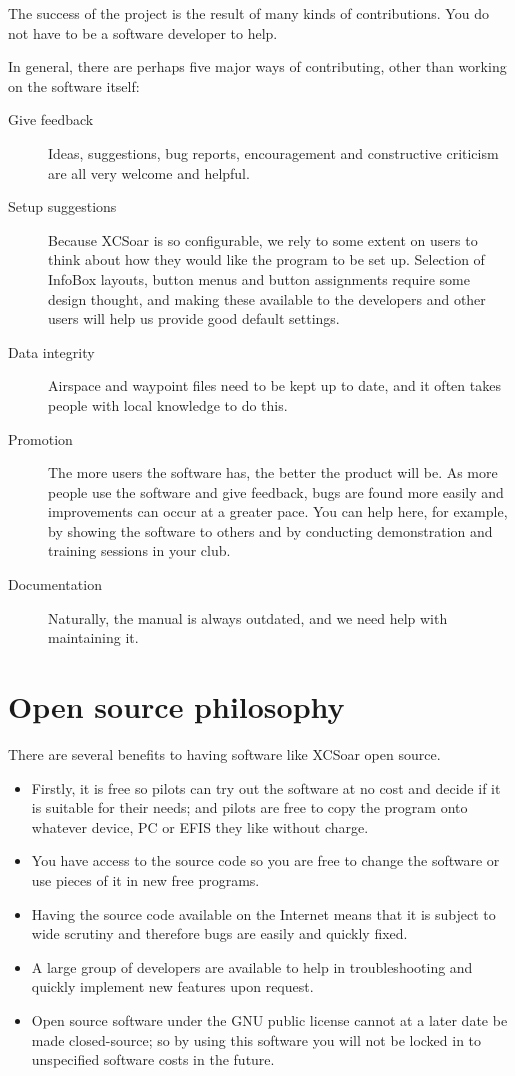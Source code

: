 The success of the project is the result of many kinds of
contributions.  You do not have to be a software developer to help.

In general, there are perhaps five major ways of contributing, other
than working on the software itself:
\begin{description}
\item[Give feedback]
Ideas, suggestions, bug reports, encouragement and
constructive criticism are all very welcome and helpful.
\item[Setup suggestions]
Because XCSoar is so configurable, we rely to some extent on users to
think about how they would like the program to be set up.  Selection
of InfoBox layouts, button menus and button assignments require some
design thought, and making these available to the developers and other
users will help us provide good default settings.
\item[Data integrity]
Airspace and waypoint files need to be kept up to date, and it often
takes people with local knowledge to do this.
\item[Promotion]  The more users the software has, the better
 the product will be.  As more people use the software and give
 feedback, bugs are found more easily and improvements can occur at a
 greater pace.  You can help here, for example, by showing the
 software to others and by conducting demonstration and training
 sessions in your club.
\item[Documentation]  Naturally, the manual is always outdated, and we
  need help with maintaining it.
\end{description}


\section{Open source philosophy}

There are several benefits to having software like XCSoar open source.

\begin{itemize}
\item Firstly, it is free so pilots can try out the software at no
 cost and decide if it is suitable for their needs; and pilots are free
 to copy the program onto whatever device, PC or EFIS they like
 without charge.
\item You have access to the source code so you are free to change
 the software or use pieces of it in new free programs.
\item Having the source code available on the Internet means that it is
 subject to wide scrutiny and therefore bugs are easily and quickly fixed.
\item A large group of developers are available to help in troubleshooting
 and quickly implement new features upon request.
\item Open source software under the GNU public license cannot at a later
 date be made closed-source; so by using this software you will not be
 locked in to unspecified software costs in the future.
\end{itemize}

